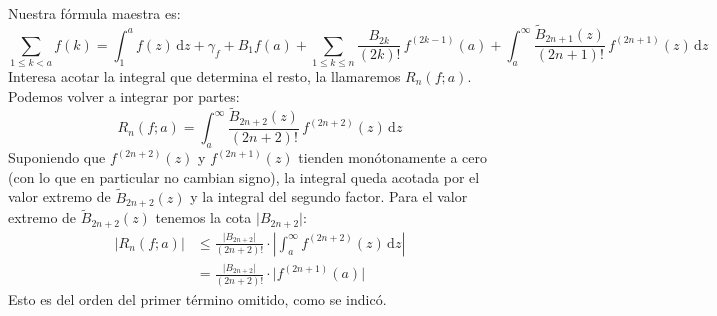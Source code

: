   Nuestra fórmula maestra es:
  \begin{equation*}
    \sum_{1 \le k < a} f(k)
      = \int_1^a f(z) \, \mathrm{d} z
	  + \gamma_f
	  + B_1 f(a)
	  + \sum_{1 \le k \le n}
	       \frac{B_{2 k}}{(2 k)!} \, f^{(2 k - 1)}(a)
	  + \int_a^\infty
	      \frac{\widetilde{B}_{2 n + 1}(z)}{(2 n + 1)!} \,
			      f^{(2 n + 1)}(z) \, \mathrm{d} z
  \end{equation*}
  Interesa acotar la integral que determina el resto,
  la llamaremos \(R_n(f; a)\).
  Podemos volver a integrar por partes:
  \begin{equation*}
    R_n(f; a)
      = \int_a^\infty \frac{\widetilde{B}_{2 n + 2}(z)}
			   {(2 n + 2)!} \,
			      f^{(2 n + 2)}(z) \, \mathrm{d} z
  \end{equation*}
  Suponiendo que \(f^{(2 n + 2)}(z)\) y \(f^{(2 n + 1)}(z)\)
  tienden monótonamente a cero
  (con lo que en particular no cambian signo),
  la integral queda acotada
  por el valor extremo de \(\widetilde{B}_{2 n + 2}(z)\)
  y la integral del segundo factor.
  Para el valor extremo de \(\widetilde{B}_{2 n + 2}(z)\)
  tenemos la cota \(\lvert B_{2 n + 2} \rvert\):%
  \begin{align*}
    \lvert R_n(f; a) \rvert
      &\le \frac{\lvert B_{2 n + 2} \rvert}{(2 n + 2)!}
	      \cdot \left\lvert
		      \int_a^\infty f^{(2 n + 2)}(z)
			\, \mathrm{d} z
		    \right\rvert \\
      &= \frac{\lvert B_{2 n + 2} \rvert}{(2 n + 2)!}
	   \cdot \lvert f^{(2 n + 1)}(a) \rvert
  \end{align*}
  Esto es del orden del primer término omitido,
  como se indicó.

